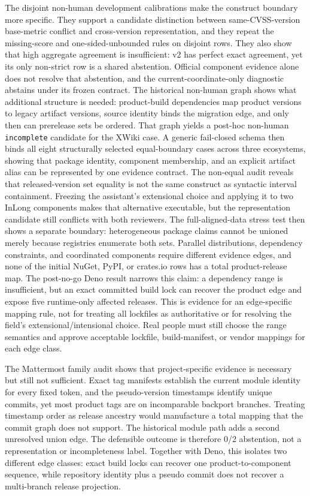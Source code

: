 The disjoint non-human development calibrations make the construct boundary more specific. They support a candidate distinction between same-CVSS-version base-metric conflict and cross-version representation, and they repeat the missing-score and one-sided-unbounded rules on disjoint rows. They also show that high aggregate agreement is insufficient: v2 has perfect exact agreement, yet its only non-strict row is a shared abstention. Official component evidence alone does not resolve that abstention, and the current-coordinate-only diagnostic abstains under its frozen contract. The historical non-human graph shows what additional structure is needed: product-build dependencies map product versions to legacy artifact versions, source identity binds the migration edge, and only then can prerelease sets be ordered. That graph yields a post-hoc non-human \texttt{incomplete} candidate for the XWiki case. A generic fail-closed schema then binds all eight structurally selected equal-boundary cases across three ecosystems, showing that package identity, component membership, and an explicit artifact alias can be represented by one evidence contract. The non-equal audit reveals that released-version set equality is not the same construct as syntactic interval containment. Freezing the assistant's extensional choice and applying it to two InLong components makes that alternative executable, but the representation candidate still conflicts with both reviewers. The full-aligned-data stress test then shows a separate boundary: heterogeneous package claims cannot be unioned merely because registries enumerate both sets. Parallel distributions, dependency constraints, and coordinated components require different evidence edges, and none of the initial NuGet, PyPI, or crates.io rows has a total product-release map. The post-no-go Deno result narrows this claim: a dependency range is insufficient, but an exact committed build lock can recover the product edge and expose five runtime-only affected releases. This is evidence for an edge-specific mapping rule, not for treating all lockfiles as authoritative or for resolving the field's extensional/intensional choice. Real people must still choose the range semantics and approve acceptable lockfile, build-manifest, or vendor mappings for each edge class.

The Mattermost family audit shows that project-specific evidence is necessary but still not sufficient. Exact tag manifests establish the current module identity for every fixed token, and the pseudo-version timestamps identify unique commits, yet most product tags are on incomparable backport branches. Treating timestamp order as release ancestry would manufacture a total mapping that the commit graph does not support. The historical module path adds a second unresolved union edge. The defensible outcome is therefore 0/2 abstention, not a representation or incompleteness label. Together with Deno, this isolates two different edge classes: exact build locks can recover one product-to-component sequence, while repository identity plus a pseudo commit does not recover a multi-branch release projection.

